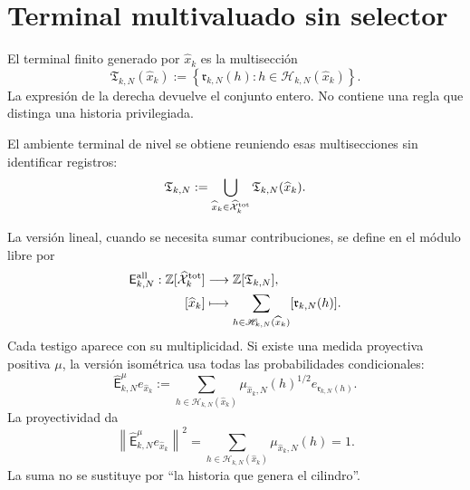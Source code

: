 \section{Terminal multivaluado sin selector}

El terminal finito generado por \(\widehat x_k\) es la multisecci\'on
\begin{equation}
\label{eq:pdfv2-terminal-multivaluado}
 \mathfrak T_{k,N}(\widehat x_k)
 :=\left\{\mathfrak r_{k,N}(h):
            h\in\mathscr H_{k,N}(\widehat x_k)\right\}.
\end{equation}
La expresi\'on de la derecha devuelve el conjunto entero. No contiene una
regla que distinga una historia privilegiada.

El ambiente terminal de nivel se obtiene reuniendo esas multisecciones sin
identificar registros:
\begin{equation}
\label{eq:pdfv2-terminal-ambiente-nivel}
 \mathfrak T_{k,N}
 :=\bigcup_{\widehat x_k\in\widehat{\mathcal X}^{\rm tot}_k}
   \mathfrak T_{k,N}(\widehat x_k).
\end{equation}

La versi\'on lineal, cuando se necesita sumar contribuciones, se define en
el m\'odulo libre por
\begin{equation}
\label{eq:pdfv2-terminal-evaluacion-todas}
 \begin{aligned}
 \mathsf E_{k,N}^{\rm all}:
 \mathbb Z[\widehat{\mathcal X}^{\rm tot}_k]&\longrightarrow
 \mathbb Z[\mathfrak T_{k,N}],\\
 [\widehat x_k]&\longmapsto
 \sum_{h\in\mathscr H_{k,N}(\widehat x_k)}
 [\mathfrak r_{k,N}(h)].
 \end{aligned}
\end{equation}
Cada testigo aparece con su multiplicidad. Si existe una medida proyectiva
positiva \(\mu\), la versi\'on isom\'etrica usa todas las probabilidades
condicionales:
\begin{equation}
\label{eq:pdfv2-terminal-evaluacion-ponderada}
 \widehat{\mathsf E}_{k,N}^{\mu}e_{\widehat x_k}
 :=\sum_{h\in\mathscr H_{k,N}(\widehat x_k)}
 \mu_{\widehat x_k,N}(h)^{1/2}
 e_{\mathfrak r_{k,N}(h)}.
\end{equation}
La proyectividad da
\begin{equation}
\label{eq:pdfv2-terminal-isometria}
 \left\|\widehat{\mathsf E}_{k,N}^{\mu}e_{\widehat x_k}\right\|^2
 =\sum_{h\in\mathscr H_{k,N}(\widehat x_k)}
   \mu_{\widehat x_k,N}(h)=1.
\end{equation}
La suma no se sustituye por ``la historia que genera el cilindro''.

